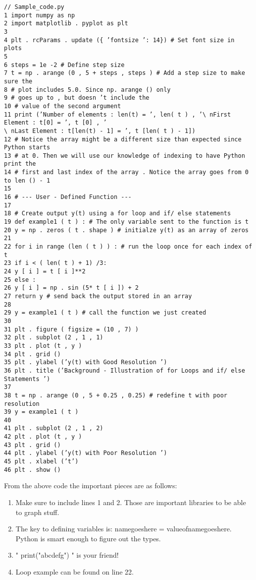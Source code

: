 \documentclass[12pt]{article}
\begin{document}
\begin{lstlisting}
// Sample_code.py
1 import numpy as np
2 import matplotlib . pyplot as plt
3
4 plt . rcParams . update ({ ’fontsize ’: 14}) # Set font size in plots
5
6 steps = 1e -2 # Define step size
7 t = np . arange (0 , 5 + steps , steps ) # Add a step size to make sure the
8 # plot includes 5.0. Since np. arange () only
9 # goes up to , but doesn ’t include the
10 # value of the second argument
11 print (’Number of elements : len(t) = ’, len( t ) , ’\ nFirst Element : t[0] = ’, t [0] , ’
\ nLast Element : t[len(t) - 1] = ’, t [len( t ) - 1])
12 # Notice the array might be a different size than expected since Python starts
13 # at 0. Then we will use our knowledge of indexing to have Python print the
14 # first and last index of the array . Notice the array goes from 0 to len () - 1
15
16 # --- User - Defined Function ---
17
18 # Create output y(t) using a for loop and if/ else statements
19 def example1 ( t ) : # The only variable sent to the function is t
20 y = np . zeros ( t . shape ) # initialze y(t) as an array of zeros
21
22 for i in range (len ( t ) ) : # run the loop once for each index of t
23 if i < ( len( t ) + 1) /3:
24 y [ i ] = t [ i ]**2
25 else :
26 y [ i ] = np . sin (5* t [ i ]) + 2
27 return y # send back the output stored in an array
28
29 y = example1 ( t ) # call the function we just created
30
31 plt . figure ( figsize = (10 , 7) )
32 plt . subplot (2 , 1 , 1)
33 plt . plot (t , y )
34 plt . grid ()
35 plt . ylabel (’y(t) with Good Resolution ’)
36 plt . title (’Background - Illustration of for Loops and if/ else Statements ’)
37
38 t = np . arange (0 , 5 + 0.25 , 0.25) # redefine t with poor resolution
39 y = example1 ( t )
40
41 plt . subplot (2 , 1 , 2)
42 plt . plot (t , y )
43 plt . grid ()
44 plt . ylabel (’y(t) with Poor Resolution ’)
45 plt . xlabel (’t’)
46 plt . show ()
\end{lstlisting}

From the above code the important pieces are as follows:

\begin{enumerate}
    \item Make sure to include lines 1 and 2. Those are important libraries to be able to graph stuff.
    \item The key to defining variables is: namegoeshere = valueofnamegoeshere. Python is smart enough to figure out the types.
    \item " print("abcdefg") " is your friend! 
    \item Loop example can be found on line 22.
\end{enumerate}
\end{document}
